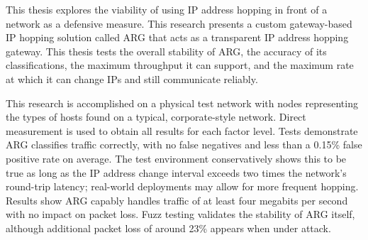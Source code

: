\acresetall

\par This thesis explores the viability of using \ac{IP} address hopping in front of a network as a defensive measure. This research presents a custom gateway-based \ac{IP} hopping solution called \ac{ARG} that acts as a transparent \ac{IP} address hopping gateway. This thesis tests the overall stability of \ac{ARG}, the accuracy of its classifications, the maximum throughput it can support, and the maximum rate at which it can change \acp{IP} and still communicate reliably.

\par This research is accomplished on a physical test network with nodes representing the types of hosts found on a typical, corporate-style network. Direct measurement is used to obtain all results for each factor level. Tests demonstrate \ac{ARG} classifies traffic correctly, with no false negatives and less than a 0.15\% false positive rate on average. The test environment conservatively shows this to be true as long as the \ac{IP} address change interval exceeds two times the network's round-trip latency; real-world deployments may allow for more frequent hopping. Results show \ac{ARG} capably handles traffic of at least four megabits per second with no impact on packet loss. Fuzz testing validates the stability of \ac{ARG} itself, although additional packet loss of around 23\% appears when under attack.

\acresetall

